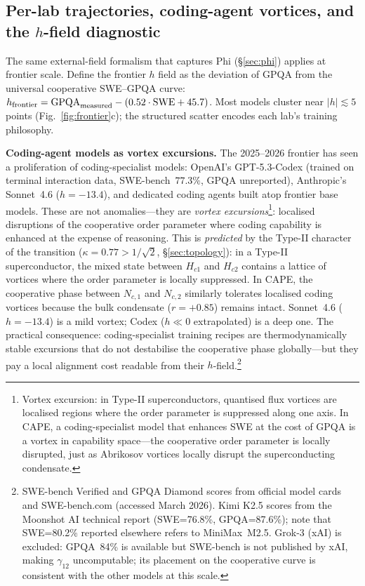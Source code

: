 \documentclass[11pt]{article}
\begin{document}
\subsection{Per-lab trajectories, coding-agent vortices, and the $h$-field diagnostic}
\label{sec:per_lab}

The same external-field formalism that captures Phi (\S\ref{sec:phi}) applies at frontier scale.
Define the frontier $h$ field as the deviation of GPQA from the universal cooperative SWE--GPQA curve:
$h_{\rm frontier} = \text{GPQA}_{\rm measured} - (0.52\cdot\text{SWE} + 45.7)$.
Most models cluster near $|h| \lesssim 5$ points (Fig.~\ref{fig:frontier}c); the structured scatter encodes each lab's training philosophy.

\textbf{Coding-agent models as vortex excursions.}
The 2025--2026 frontier has seen a proliferation of coding-specialist models: OpenAI's GPT-5.3-Codex (trained on terminal interaction data, SWE-bench~$77.3\%$, GPQA unreported), Anthropic's Sonnet~4.6 ($h = -13.4$), and dedicated coding agents built atop frontier base models.
These are not anomalies---they are \emph{vortex excursions}\footnote{Vortex excursion: in Type-II superconductors, quantised flux vortices are localised regions where the order parameter is suppressed along one axis. In CAPE, a coding-specialist model that enhances SWE at the cost of GPQA is a vortex in capability space---the cooperative order parameter is locally disrupted, just as Abrikosov vortices locally disrupt the superconducting condensate.}: localised disruptions of the cooperative order parameter where coding capability is enhanced at the expense of reasoning.
This is \emph{predicted} by the Type-II character of the transition ($\kappa = 0.77 > 1/\sqrt{2}$, \S\ref{sec:topology}): in a Type-II superconductor, the mixed state between $H_{c1}$ and $H_{c2}$ contains a lattice of vortices where the order parameter is locally suppressed.
In CAPE, the cooperative phase between $N_{c,1}$ and $N_{c,2}$ similarly tolerates localised coding vortices because the bulk condensate ($r = +0.85$) remains intact.
Sonnet~4.6 ($h = -13.4$) is a mild vortex; Codex ($h \ll 0$ extrapolated) is a deep one.
The practical consequence: coding-specialist training recipes are thermodynamically stable excursions that do not destabilise the cooperative phase globally---but they pay a local alignment cost readable from their $h$-field.\footnote{SWE-bench Verified and GPQA Diamond scores from official model cards and SWE-bench.com (accessed March 2026).
Kimi K2.5 scores from the Moonshot AI technical report (SWE=76.8\%, GPQA=87.6\%); note that SWE=80.2\% reported elsewhere refers to MiniMax~M2.5.
Grok-3 (xAI) is excluded: GPQA~84\% is available but SWE-bench is not published by xAI, making $\gamma_{12}$ uncomputable; its placement on the cooperative curve is consistent with the other models at this scale.}
\end{document}
